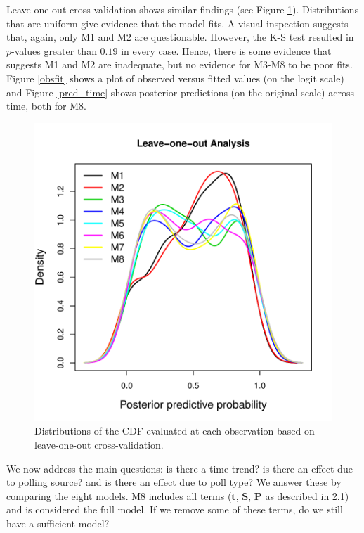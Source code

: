 \documentclass{asaproc}
\newcommand{\m}[1]{\mathbf{\bm{#1}}}
\begin{document}
Leave-one-out cross-validation shows similar findings (see Figure \ref{loo}). Distributions that are uniform give evidence that the model fits. A visual inspection suggests that, again, only M1 and M2 are questionable. However, the K-S test resulted in $p$-values greater than $0.19$ in every case. Hence, there is some evidence that suggests M1 and M2 are inadequate, but no evidence for M3-M8 to be poor fits. Figure \ref{obsfit} shows a plot of observed versus fitted values (on the logit scale) and Figure \ref{pred_time} shows posterior predictions (on the original scale) across time, both for M8. 
\begin{figure}
\centering
\includegraphics[scale=0.55]{figs/loo.pdf}
\caption{Distributions of the CDF evaluated at each observation based on leave-one-out cross-validation.}
\label{loo}
\end{figure}

We now address the main questions: is there a time trend? is there an effect due to polling source? and is there an effect due to poll type? We answer these by comparing the eight models. M8 includes all terms ($\m{t}$, $\m{S}$, $\m{P}$ as described in 2.1) and is considered the full model. If we remove some of these terms, do we still have a sufficient model?
\end{document}

